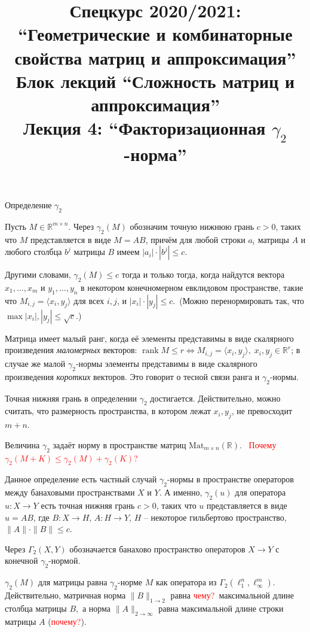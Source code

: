 \documentclass[handout]{beamer}
\title{Спецкурс 2020/2021: ``Геометрические и комбинаторные свойства матриц и
аппроксимация'' \\ Блок лекций ``Сложность матриц и аппроксимация'' \\ Лекция 4:
``Факторизационная $\gamma_2$-норма''}
\renewcommand\le{\leqslant}
\newcommand\R{\mathbb R}
\DeclareMathOperator{\rank}{rank}
\begin{document}
\maketitle


\begin{frame}{Определение $\gamma_2$}

    Пусть $M\in\R^{m\times n}$.
    Через $\gamma_2(M)$ обозначим точную нижнюю грань $c>0$, таких что $M$
представляется в виде $M=AB$, причём для любой строки $a_i$ матрицы
$A$ и любого столбца $b^j$ матрицы $B$ имеем $|a_i|\cdot|b^j|\le c$.
    \pause\vspace{5pt}

Другими словами, $\gamma_2(M)\le c$ тогда и только тогда, когда найдутся
вектора $x_1,\ldots,x_m$ и $y_1,\ldots,y_n$ в некотором
конечномерном евклидовом пространстве, такие что $M_{i,j}=\langle
x_i,y_j\rangle$ для всех $i,j$, и $|x_i| \cdot |y_j|
    \le c$.\pause~(Можно перенормировать так, что
    $\max|x_i|,|y_j|\le\sqrt{c}$.)
    \pause\vspace{5pt}

Матрица имеет малый ранг, когда её элементы представимы в виде скалярного
    произведения \textit{маломерных} векторов: $\rank M\le r\Leftrightarrow
M_{i,j}=\langle x_i,y_j\rangle,\;x_i,y_j\in\mathbb R^r$; в случае же малой
$\gamma_2$-нормы элементы представимы в виде скалярного произведения
    \textit{коротких} векторов. Это говорит о тесной связи ранга и $\gamma_2$-нормы.
    \pause\vspace{5pt}

Точная нижняя грань в определении $\gamma_2$ достигается. Действительно,
можно считать, что размерность пространства, в котором лежат $x_i,y_j$, не
превосходит $m+n$.

\end{frame}

\begin{frame}
Величина $\gamma_2$ задаёт норму в пространстве матриц
$\mathrm{Mat}_{m\times n}(\mathbb R)$.
    \pause~\textcolor{red}{Почему $\gamma_2(M+K)\le\gamma_2(M)+\gamma_2(K)$?}
    \pause\vspace{5pt}

Данное определение есть частный случай $\gamma_2$-нормы в пространстве
операторов между банаховыми пространствами $X$ и $Y$. А именно,
$\gamma_2(u)$ для оператора $u\colon X\to Y$ есть точная нижняя
грань $c>0$, таких что $u$ представляется в виде $u=AB$, где
$B\colon X\to H$, $A\colon H\to Y$, $H$ -- некоторое
гильбертово пространство, $\|A\|\cdot\|B\|\le c$.
    \pause\vspace{5pt}

Через $\Gamma_2(X,Y)$ обозначается банахово пространство операторов $X\to Y$ с конечной $\gamma_2$-нормой.
    \pause\vspace{5pt}

    $\gamma_2(M)$ для матрицы равна $\gamma_2$-норме $M$ как оператора из
    $\Gamma_2(\ell_1^n,\ell_\infty^m)$.
    Действительно, матричная норма $\|B\|_{1\to2}$ равна
    \textcolor{red}{чему?}\pause~максимальной длине
    столбца матрицы $B$,\pause~а норма $\|A\|_{2\to\infty}$ равна максимальной длине
    строки матрицы $A$ (\textcolor{red}{почему?}).
\end{frame}
\end{document}

